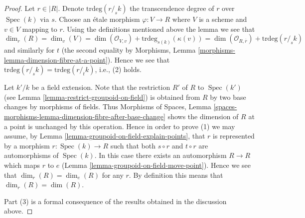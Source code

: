 \documentclass{stacks-project}
\theoremstyle{plain}
\theoremstyle{definition}
\theoremstyle{remark}
\numberwithin{equation}{subsection}
\def\Spec{\mathop{\mathrm{Spec}}}
\begin{document}
\begin{proof}
Let $r \in |R|$. Denote $\text{trdeg}(r/_{\!\! s}k)$ the transcendence
degree of $r$ over $\Spec(k)$ via $s$. Choose an \'etale morphism
$\varphi : V \to R$ where $V$ is a scheme and $v \in V$ mapping to $r$.
Using the definitions mentioned above the lemma we see that
$$
\dim_r(R) = \dim_v(V) =
\dim(\mathcal{O}_{V, v}) + \text{trdeg}_{s(k)}(\kappa(v)) =
\dim(\mathcal{O}_{R, \overline{r}}) + \text{trdeg}(r/_{\!\! s}k)
$$
and similarly for $t$ (the second equality by
Morphisms, Lemma \ref{morphisms-lemma-dimension-fibre-at-a-point}).
Hence we see that $\text{trdeg}(r/_{\!\! s}k) = \text{trdeg}(r/_{\!\! t}k)$,
i.e., (2) holds.

\medskip\noindent
Let $k'/k$ be a field extension. Note that the restriction $R'$
of $R$ to $\Spec(k')$ (see
Lemma \ref{lemma-restrict-groupoid-on-field})
is obtained from $R$ by two base changes by morphisms of fields. Thus
Morphisms of Spaces,
Lemma \ref{spaces-morphisms-lemma-dimension-fibre-after-base-change}
shows the dimension of $R$ at a point is unchanged by this operation.
Hence in order to prove (1) we may assume, by
Lemma \ref{lemma-groupoid-on-field-explain-points},
that $r$ is represented by a morphism $r : \Spec(k) \to R$ such
that both $s \circ r$ and $t \circ r$ are automorphisms of $\Spec(k)$.
In this case there exists an automorphism $R \to R$ which maps $r$ to $e$
(Lemma \ref{lemma-groupoid-on-field-move-point}).
Hence we see that $\dim_r(R) = \dim_e(R)$ for any $r$. By definition this
means that $\dim_r(R) = \dim(R)$.

\medskip\noindent
Part (3) is a formal consequence of the results obtained in the discussion
above.
\end{proof}
\end{document}
